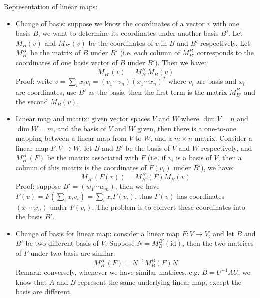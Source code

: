 \documentclass{report}
\begin{document}
Representation of linear maps: 
\begin{itemize}
	\item Change of basis: suppose we know the coordinates of a vector $v$ with one basis $B$, we want to determine its coordinates under another basis $B'$. Let $M_B(v)$ and $M_{B'}(v)$ be the coordinates of $v$ in $B$ and $B'$ respectively. Let $M^B_{B'}$ be the matrix of $B$ under $B'$ (i.e. each column of $M^B_{B'}$ corresponds to the coordinates of one basis vector of $B$ under $B'$). Then we have: 
	\begin{equation}
	M_{B'}(v) = M^B_{B'} M_B(v)	
	\end{equation}
	Proof: write $v = \sum_i x_i v_i = (v_1 \cdots v_n) (x_1 \cdots x_n)^T $ where $v_i$ are basis and $x_i$ are coordinates, use $B'$ as the basis, then the first term is the matrix $M^B_{B'}$ and the second $M_B(v)$. 
	
	\item Linear map and matrix: given vector spaces $V$ and $W$ where $\dim V = n$ and $\dim W = m$, and the basis of $V$ and $W$ given, then there is a one-to-one mapping between a linear map from $V$ to $W$, and a $m \times n$ matrix. Consider a linear map $F: V \rightarrow W$, let $B$ and $B'$ be the basis of $V$ and $W$ respectively, and $M^B_{B'}(F)$ be the matrix associated with $F$ (i.e. if $v_i$ is a basis of $V$, then a column of this matrix is the coordinates of $F(v_i)$ under $B'$), we have: 
	\begin{equation}
	M_{B'}(F(v)) = M^B_{B'}(F) M_B(v)		
	\end{equation}
	Proof: suppose $B' = (w_1 \cdots w_m)$, then we have $F(v) = F(\sum_i x_i v_i) = \sum_i x_i F(v_i)$, thus $F(v)$ has coordinates $(x_1 \cdots x_n)$ under $F(v_i)$. The problem is to convert these coordinates into the basis $B'$. 
	
	\item Change of basis for linear map: consider a linear map $F: V \rightarrow V$, and let $B$ and $B'$ be two different basis of $V$. Suppose $N = M^{B'}_B(\text{id})$, then the two matrices of $F$ under two basis are similar:  
	\begin{equation}
	M^{B'}_{B'}(F) = N^{-1} M^{B}_{B}(F) N
	\end{equation}
	Remark: conversely, whenever we have similar matrices, e.g. $B = U^{-1} A U$, we know that $A$ and $B$ represent the same underlying linear map, except the basis are different. 
\end{itemize}
\end{document}
